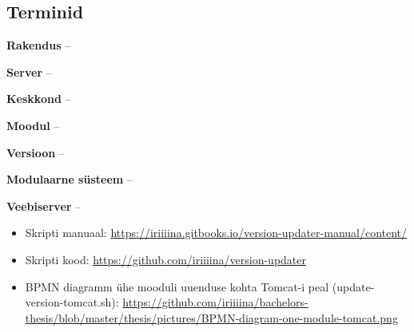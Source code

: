 \documentclass[12pt]{report}
\begin{document}
  \subsection{Terminid}
  
  \textbf{Rakendus} \---
  
  \textbf{Server} \---
  
  \textbf{Keskkond} \---
  
  \textbf{Moodul} \---
  
  \textbf{Versioon} \---
  
  \textbf{Modulaarne süsteem} \---
  
  \textbf{Veebiserver} \---
  
  \begin{itemize}
  
    \item Skripti manuaal: \url{https://iriiiina.gitbooks.io/version-updater-manual/content/}
    
    \item Skripti kood: \url{https://github.com/iriiiina/version-updater}
  
    \item BPMN diagramm ühe mooduli uuenduse kohta Tomcat-i peal (update-version-tomcat.sh): \url{https://github.com/iriiiina/bachelors-thesis/blob/master/thesis/pictures/BPMN-diagram-one-module-tomcat.png}   
  
  \end{itemize}
\end{document}
